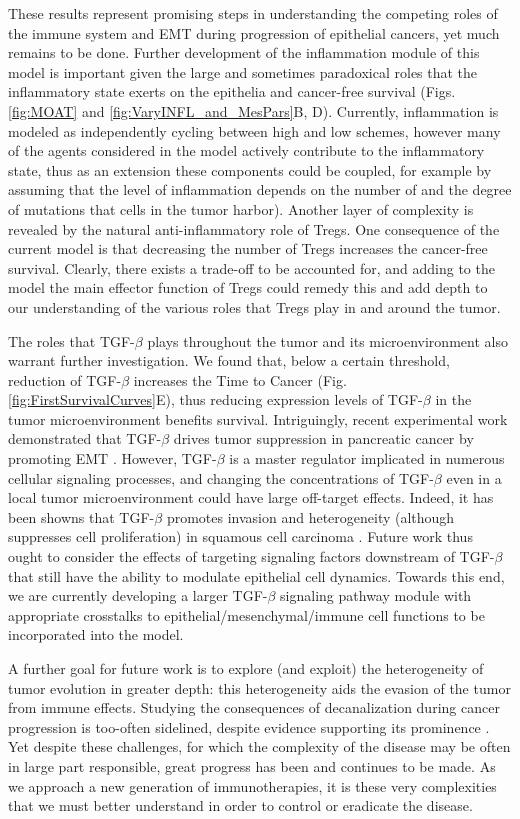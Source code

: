 \documentclass[11pt]{article}
\begin{document}
These results represent promising steps in understanding the competing roles of the immune system and EMT during progression of epithelial cancers, yet much remains to be done. Further development of the inflammation module of this model is important given the large and sometimes paradoxical roles that the inflammatory state exerts on the epithelia and cancer-free survival (Figs. \ref{fig:MOAT} and \ref{fig:VaryINFL_and_MesPars}B, D). Currently, inflammation is modeled as independently cycling between high and low schemes, however many of the agents considered in the model actively contribute to the inflammatory state, thus as an extension these components could be coupled, for example by assuming that the level of inflammation depends on the number of and the degree of mutations that cells in the tumor harbor).
Another layer of complexity is revealed by the natural anti-inflammatory role of Tregs. One consequence of the current model is that decreasing the number of Tregs increases the cancer-free survival. Clearly, there exists a trade-off to be accounted for, and adding to the model the main effector function of Tregs could remedy this and add depth to our understanding of the various roles that Tregs play in and around the tumor.
\par
The roles that TGF-$\beta$ plays throughout the tumor and its microenvironment also warrant further investigation. We found that, below a certain threshold, reduction of TGF-$\beta$ increases the Time to Cancer  (Fig. \ref{fig:FirstSurvivalCurves}E), thus reducing expression levels of TGF-$\beta$ in the tumor microenvironment benefits survival. Intriguingly, recent experimental work demonstrated that TGF-$\beta$ drives tumor suppression in pancreatic cancer by promoting EMT \cite{david16_tgfv}. However, TGF-$\beta$ is a master regulator implicated in numerous cellular signaling processes, and changing the concentrations of TGF-$\beta$ even in a local tumor microenvironment could have large off-target effects. Indeed, it has been showns that TGF-$\beta$ promotes invasion and heterogeneity (although suppresses cell proliferation) in squamous cell carcinoma \cite{oshimori15_tgfv}. Future work thus ought to consider the effects of targeting signaling factors downstream of TGF-$\beta$ that still have the ability to modulate epithelial cell dynamics. Towards this end, we are currently developing a larger TGF-$\beta$ signaling pathway module with appropriate crosstalks to  epithelial/mesenchymal/immune cell functions to be incorporated into the model.
\par
A further goal for future work is to explore (and exploit) the heterogeneity of tumor evolution in greater depth: this heterogeneity aids the evasion of the tumor from immune effects. Studying the consequences of decanalization \cite{gibson09_decanalization} during cancer progression is too-often sidelined, despite evidence supporting its prominence \cite{cyll17_tumour, punt17_tumour, dagogo-jack18_tumour}. Yet despite these challenges, for which the complexity of the disease may be often in large part responsible, great progress has been and continues to be made. As we approach a new generation of immunotherapies, it is these very complexities that we must better understand in order to control or eradicate the disease.
\end{document}
